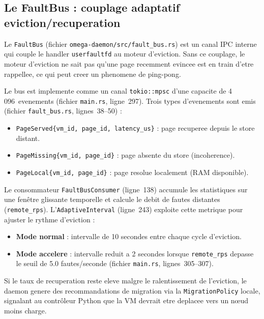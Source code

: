 \subsection{Le FaultBus : couplage adaptatif eviction/recuperation}
\label{subsec:faultbus}

Le \texttt{FaultBus} (fichier \texttt{omega-daemon/src/fault\_bus.rs}) est un canal IPC interne qui couple le handler \texttt{userfaultfd} au moteur d'eviction. Sans ce couplage, le moteur d'eviction ne sait pas qu'une page recemment evincee est en train d'etre rappellee, ce qui peut creer un phenomene de ping-pong.

Le bus est implemente comme un canal \texttt{tokio::mpsc} d'une capacite de 4\,096~evenements (fichier \texttt{main.rs}, ligne~297). Trois types d'evenements sont emis (fichier \texttt{fault\_bus.rs}, lignes~38--50) :

\begin{itemize}
    \item \texttt{PageServed\{vm\_id, page\_id, latency\_us\}} : page recuperee depuis le store distant.
    \item \texttt{PageMissing\{vm\_id, page\_id\}} : page absente du store (incoherence).
    \item \texttt{PageLocal\{vm\_id, page\_id\}} : page resolue localement (RAM disponible).
\end{itemize}

Le consommateur \texttt{FaultBusConsumer} (ligne~138) accumule les statistiques sur une fen\^etre glissante temporelle et calcule le debit de fautes distantes (\texttt{remote\_rps}). L'\texttt{AdaptiveInterval} (ligne~243) exploite cette metrique pour ajuster le rythme d'eviction :

\begin{itemize}
    \item \textbf{Mode normal} : intervalle de 10 secondes entre chaque cycle d'eviction.
    \item \textbf{Mode accelere} : intervalle reduit a 2 secondes lorsque \texttt{remote\_rps} depasse le seuil de 5.0 fautes/seconde (fichier \texttt{main.rs}, lignes~305--307).
\end{itemize}

Si le taux de recuperation reste eleve malgre le ralentissement de l'eviction, le daemon genere des recommandations de migration via la \texttt{MigrationPolicy} locale, signalant au contr\^oleur Python que la VM devrait etre deplacee vers un n\oe{}ud moins charge.


